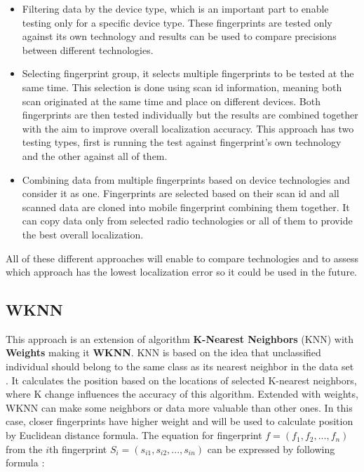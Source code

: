 \begin{itemize}
	\item Filtering data by the device type, which is an important part to enable testing only for a specific device type. These fingerprints are tested only against its own technology and results can be used to compare precisions between different technologies.
	\item Selecting fingerprint group, it selects multiple fingerprints to be tested at the same time. This selection is done using scan id information, meaning both scan originated at the same time and place on different devices. Both fingerprints are then tested individually but the results are combined together with the aim to improve overall localization accuracy. This approach has two testing types, first is running the test against fingerprint's own technology and the other against all of them.
	\item Combining data from multiple fingerprints based on device technologies and consider it as one. Fingerprints are selected based on their scan id and all scanned data are cloned into mobile fingerprint combining them together. It can copy data only from selected radio technologies or all of them to provide the best overall localization.
\end{itemize}

All of these different approaches will enable to compare technologies and to assess which approach has the lowest localization error so it could be used in the future. 

\subsection{WKNN}\label{sec:WKNN}
This approach is an extension of algorithm \textbf{K-Nearest Neighbors} (KNN) with \textbf{Weights} making it \textbf{WKNN}. KNN is based on the idea that unclassified individual should belong to the same class as its nearest neighbor in the data set \cite{HGAfC}. It calculates the position based on the locations of selected K-nearest neighbors, where K change influences the accuracy of this algorithm. Extended with weights, WKNN can make some neighbors or data more valuable than other ones. In this case, closer fingerprints have higher weight and will be used to calculate position by Euclidean distance formula. The equation for fingerprint $f = (f_1,f_2,...,f_n)$ from the $i$th fingerprint $S_i = (s_{i1} ,s_{i2},...,s_{in})$ can be expressed by following formula \cite{IILUBLEB, HGAfC}:

